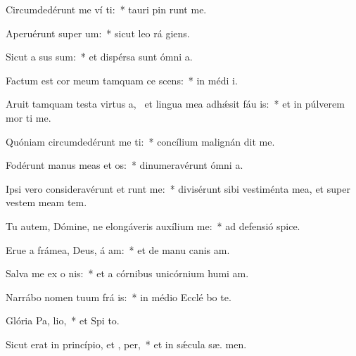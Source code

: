 \item Circumdedérunt me ví ti:~* tauri pin runt me.
\item Aperuérunt super   um:~* sicut leo rá  giens.
\item Sicut a sus sum:~* et dispérsa sunt ómni  a.
\item Factum est cor meum tamquam ce scens:~* in médi  i.
\item Aruit tamquam testa virtus a,~\pscross{} et lingua mea adhǽsit fáu is:~* et in púlverem mor ti me.
\item Quóniam circumdedérunt me  ti:~* concílium malignán dit me.
\item Fodérunt manus meas et  os:~* dinumeravérunt ómni  a.
\item Ipsi vero consideravérunt et runt me:~* divisérunt sibi vestiménta mea, et super vestem meam  tem.
\item Tu autem, Dómine, ne elongáveris auxílium   me:~* ad defensió  spice.
\item Erue a frámea, Deus, á am:~* et de manu canis  am.
\item Salva me ex o nis:~* et a córnibus unicórnium humi am.
\item Narrábo nomen tuum frá is:~* in médio Ecclé bo te.
\item Glória Pa,  lio,~* et Spi to.
\item Sicut erat in princípio, et ,  per,~* et in sǽcula sæ. men.
